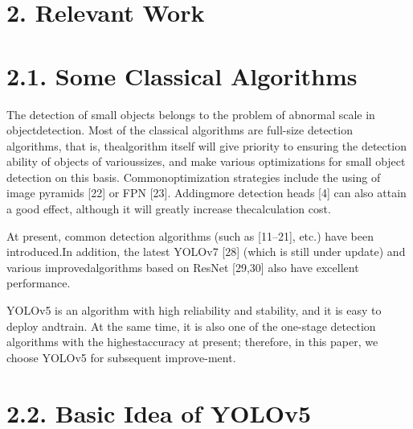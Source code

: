 \documentclass[
  10
]{article}
\begin{document}
\section{2. Relevant Work}\label{relevant-work}

\section{2.1. Some Classical
Algorithms}\label{some-classical-algorithms}

The detection of small objects belongs to the problem of abnormal scale
in objectdetection. Most of the classical algorithms are full-size
detection algorithms, that is, thealgorithm itself will give priority to
ensuring the detection ability of objects of varioussizes, and make
various optimizations for small object detection on this basis.
Commonoptimization strategies include the using of image pyramids
{[}22{]} or FPN {[}23{]}. Addingmore detection heads {[}4{]} can also
attain a good effect, although it will greatly increase thecalculation
cost.

At present, common detection algorithms (such as {[}11--21{]}, etc.)
have been introduced.In addition, the latest YOLOv7 {[}28{]} (which is
still under update) and various improvedalgorithms based on ResNet
{[}29,30{]} also have excellent performance.

YOLOv5 is an algorithm with high reliability and stability, and it is
easy to deploy andtrain. At the same time, it is also one of the
one-stage detection algorithms with the highestaccuracy at present;
therefore, in this paper, we choose YOLOv5 for subsequent improve-ment.

\section{2.2. Basic Idea of YOLOv5}\label{basic-idea-of-yolov5}
\end{document}
